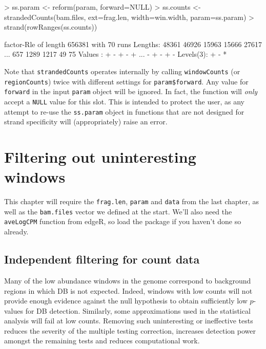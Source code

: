 \documentclass[12pt]{report}
\renewenvironment{Schunk}{\vspace{0pt}}{\vspace{0pt}}
\newcommand{\edger}{edgeR}
\newcommand{\code}[1]{{\small\texttt{#1}}}
\newenvironment{combox}
{ \begin{shaded}\begin{center}\begin{minipage}[t]{0.95\textwidth} }
{ \end{minipage}\end{center}\end{shaded} }
\begin{document}
\begin{Schunk}
\begin{Sinput}
> ss.param <- reform(param, forward=NULL)
> ss.counts <- strandedCounts(bam.files, ext=frag.len, width=win.width, param=ss.param)
> strand(rowRanges(ss.counts))
\end{Sinput}
\begin{Soutput}
factor-Rle of length 656381 with 70 runs
  Lengths: 48361 46926 15963 15666 27617 ...   657  1289  1217    49    75
  Values :     +     -     +     -     + ...     -     +     -     +     -
Levels(3): + - *
\end{Soutput}
\end{Schunk}

Note that \code{strandedCounts} operates internally by calling \code{windowCounts} (or \code{regionCounts}) twice with different settings for \code{param\$forward}. 
Any value for \code{forward} in the input \code{param} object will be ignored.
In fact, the function will \textit{only} accept a \code{NULL} value for this slot.
This is intended to protect the user, as any attempt to re-use the \code{ss.param} object in functions that are not designed for strand specificity will (appropriately) raise an error.



\chapter{Filtering out uninteresting windows}
\label{chap:filter}

\begin{combox}
This chapter will require the \code{frag.len}, \code{param} and \code{data} from the last chapter, as well as the \code{bam.files} vector we defined at the start.
We'll also need the \code{aveLogCPM} function from \edger{}, so load the package if you haven't done so already.
\end{combox}

\section{Independent filtering for count data}
Many of the low abundance windows in the genome correspond to background regions in which DB is not expected. 
Indeed, windows with low counts will not provide enough evidence against the null hypothesis to obtain sufficiently low $p$-values for DB detection. 
Similarly, some approximations used in the statistical analysis will fail at low counts. 
Removing such uninteresting or ineffective tests reduces the severity of the multiple testing correction, increases detection power amongst the remaining tests and reduces computational work.
\end{document}
